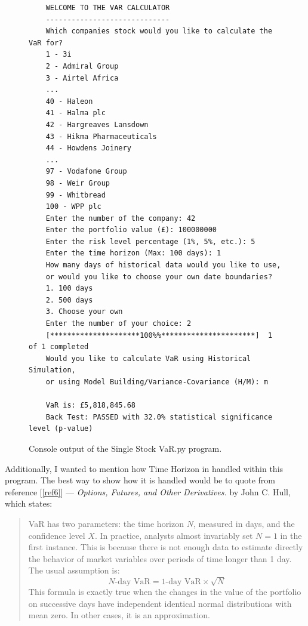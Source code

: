 \documentclass{article}
\begin{document}
\begin{figure}
  \begin{verbatim}
    WELCOME TO THE VAR CALCULATOR
    -----------------------------
    Which companies stock would you like to calculate the VaR for?
    1 - 3i
    2 - Admiral Group
    3 - Airtel Africa
    ...
    40 - Haleon
    41 - Halma plc
    42 - Hargreaves Lansdown
    43 - Hikma Pharmaceuticals
    44 - Howdens Joinery
    ...
    97 - Vodafone Group
    98 - Weir Group
    99 - Whitbread
    100 - WPP plc
    Enter the number of the company: 42
    Enter the portfolio value (£): 100000000
    Enter the risk level percentage (1%, 5%, etc.): 5
    Enter the time horizon (Max: 100 days): 1
    How many days of historical data would you like to use, 
    or would you like to choose your own date boundaries?
    1. 100 days
    2. 500 days
    3. Choose your own
    Enter the number of your choice: 2
    [*********************100%%**********************]  1 of 1 completed
    Would you like to calculate VaR using Historical Simulation, 
    or using Model Building/Variance-Covariance (H/M): m
    
    VaR is: £5,818,845.68
    Back Test: PASSED with 32.0% statistical significance level (p-value)
  \end{verbatim}
  \caption{Console output of the Single Stock VaR.py program.}\label{fig:Single Stock VaR}
\end{figure}

Additionally, I wanted to mention how Time Horizon in handled within this program. The best way to show how it is handled would be to quote from reference [\ref{ref6}] --- \textit{Options, Futures, and Other Derivatives.} by John C. Hull, which states:

 \begin{quote}
  VaR has two parameters: the time horizon \( N \), measured in days, and the confidence level \( X \). In practice, analysts almost invariably set \( N = 1 \) in the first instance. This is because there is not enough data to estimate directly the behavior of market variables over periods of time longer than 1 day. The usual assumption is: 
  \begin{equation}
    N\text{-day VaR} = \text{1-day VaR} \times \sqrt{N}
    \label{eq:Time Horizon}
  \end{equation}
  This formula is exactly true when the changes in the value of the portfolio on successive days have independent identical normal distributions with mean zero. In other cases, it is an approximation.
\end{quote}
  
\end{document}
